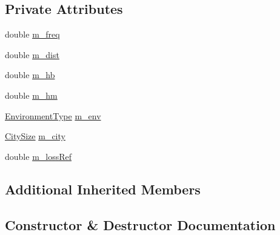 \subsection*{Private Attributes}
\begin{DoxyCompactItemize}
\item 
double \hyperlink{classOkumuraHataPropagationLossModelTestCase_a97db57ea899783a498067a625648bdd3}{m\+\_\+freq}
\item 
double \hyperlink{classOkumuraHataPropagationLossModelTestCase_ab42f14493cc336c3fe8f7c449527489a}{m\+\_\+dist}
\item 
double \hyperlink{classOkumuraHataPropagationLossModelTestCase_aabbbba0a92cb1bf56f2885a0f9e6507f}{m\+\_\+hb}
\item 
double \hyperlink{classOkumuraHataPropagationLossModelTestCase_a508282b91e977722ba50d754c8b8a4c4}{m\+\_\+hm}
\item 
\hyperlink{group__propagation_ga0e392ed771a28c92112047e63308a53a}{Environment\+Type} \hyperlink{classOkumuraHataPropagationLossModelTestCase_a0aa9acd9831499083c76b22481881331}{m\+\_\+env}
\item 
\hyperlink{group__propagation_ga29c9a1b1a58b6a56054ff5ea4c5a574d}{City\+Size} \hyperlink{classOkumuraHataPropagationLossModelTestCase_a3a89d4603efbf7eaa65ae3fa359582d7}{m\+\_\+city}
\item 
double \hyperlink{classOkumuraHataPropagationLossModelTestCase_aea0cef35a82088eea67d0f39fa517091}{m\+\_\+loss\+Ref}
\end{DoxyCompactItemize}
\subsection*{Additional Inherited Members}


\subsection{Constructor \& Destructor Documentation}
